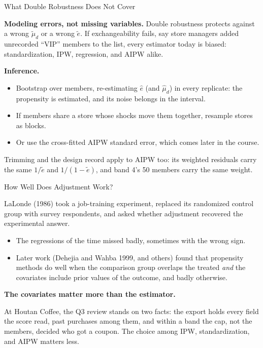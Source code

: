 \documentclass[aspectratio=169, 11pt, handout]{beamer}
\begin{document}
\begin{frame}{What Double Robustness Does Not Cover}

\textbf{Modeling errors, not missing variables.} Double robustness protects against a wrong $\tilde\mu_d$ or a wrong $\tilde e$. If exchangeability fails, say store managers added unrecorded ``VIP'' members to the list, every estimator today is biased: standardization, IPW, regression, and AIPW alike.

\bigskip

\textbf{Inference.}
\begin{itemize}
  \item Bootstrap over members, re-estimating $\hat e$ (and $\hat\mu_d$) in every replicate: the propensity is estimated, and its noise belongs in the interval.
  \item If members share a store whose shocks move them together, resample stores as blocks.
  \item Or use the cross-fitted AIPW standard error, which comes later in the course.
\end{itemize}

\bigskip

Trimming and the design record apply to AIPW too: its weighted residuals carry the same $1/\tilde e$ and $1/(1 - \tilde e)$, and band 4's 50 members carry the same weight.
\end{frame}

\begin{frame}{How Well Does Adjustment Work?}

LaLonde (1986) took a job-training experiment, replaced its randomized control group with survey respondents, and asked whether adjustment recovered the experimental answer.

\begin{itemize}
  \item The regressions of the time missed badly, sometimes with the wrong sign.
  \item Later work (Dehejia and Wahba 1999, and others) found that propensity methods do well when the comparison group overlaps the treated \emph{and} the covariates include prior values of the outcome, and badly otherwise.
\end{itemize}

\bigskip

\textbf{The covariates matter more than the estimator.}

\medskip

At Houtan Coffee, the Q3 review stands on two facts: the export holds every field the score read, past purchases among them, and within a band the cap, not the members, decided who got a coupon. The choice among IPW, standardization, and AIPW matters less.
\end{frame}
\end{document}

